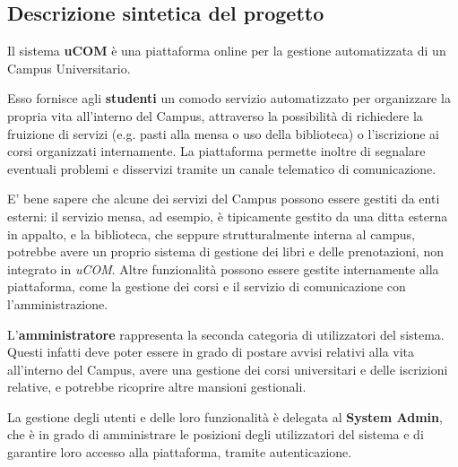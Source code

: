 \subsection{Descrizione sintetica del progetto}

Il sistema \textbf{uCOM} è una piattaforma online per la gestione automatizzata di un Campus Universitario.

Esso fornisce agli \textbf{studenti }un comodo servizio automatizzato per organizzare la propria vita all'interno del Campus, attraverso la possibilità di richiedere la fruizione di servizi (e.g. pasti alla mensa o uso della biblioteca) o l'iscrizione ai corsi organizzati internamente. 
La piattaforma permette inoltre di segnalare eventuali problemi e disservizi tramite un canale telematico di comunicazione.

E' bene sapere che alcune dei servizi del Campus possono essere gestiti da enti esterni: il servizio mensa, ad esempio, è tipicamente gestito da una ditta esterna in appalto, e la biblioteca, che seppure strutturalmente interna al campus, potrebbe avere un proprio sistema di gestione dei libri e delle prenotazioni, non integrato in \textit{uCOM}.
Altre funzionalità possono essere gestite internamente alla piattaforma, come la gestione dei corsi e il servizio di comunicazione con l'amministrazione.

L'\textbf{amministratore} rappresenta la seconda categoria di utilizzatori del sistema. Questi infatti deve poter essere in grado di postare avvisi relativi alla vita all'interno del Campus, avere una gestione dei corsi universitari e delle iscrizioni relative, e potrebbe ricoprire altre mansioni gestionali.

La gestione degli utenti e delle loro funzionalità è delegata al \textbf{System Admin}, che è in grado di amministrare le posizioni degli utilizzatori del sistema e di garantire loro accesso alla piattaforma, tramite autenticazione.